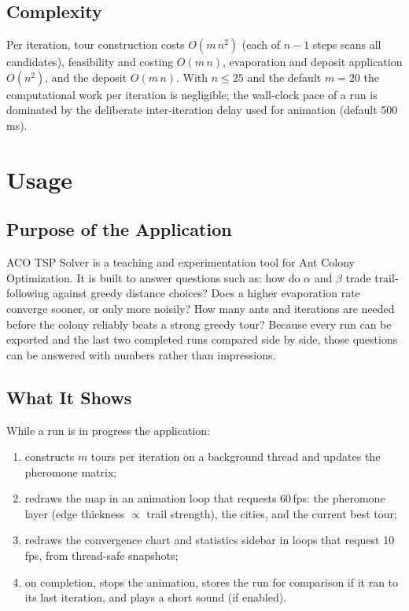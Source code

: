 \documentclass[11pt,a4paper]{article}
\begin{document}
\subsection{Complexity}
Per iteration, tour construction costs $O(m\,n^2)$ (each of $n-1$ steps scans all candidates), feasibility
and costing $O(m\,n)$, evaporation and deposit application $O(n^2)$, and the deposit $O(m\,n)$. With
$n\le25$ and the default $m=20$ the computational work per iteration is negligible; the wall-clock pace of a
run is dominated by the deliberate inter-iteration delay used for animation (default 500\,ms).

\section{Usage}

\subsection{Purpose of the Application}
ACO TSP Solver is a teaching and experimentation tool for Ant Colony Optimization. It is built to answer
questions such as: how do $\alpha$ and $\beta$ trade trail-following against greedy distance choices? Does a
higher evaporation rate converge sooner, or only more noisily? How many ants and iterations are needed
before the colony reliably beats a strong greedy tour? Because every run can be exported and the last two
completed runs compared side by side, those questions can be answered with numbers rather than
impressions.

\subsection{What It Shows}
While a run is in progress the application:
\begin{enumerate}
  \item constructs $m$ tours per iteration on a background thread and updates the pheromone matrix;
  \item redraws the map in an animation loop that requests 60\,fps: the pheromone layer (edge thickness $\propto$ trail strength),
        the cities, and the current best tour;
  \item redraws the convergence chart and statistics sidebar in loops that request 10\,fps, from thread-safe snapshots;
  \item on completion, stops the animation, stores the run for comparison if it ran to its last
        iteration, and plays a short sound (if enabled).
\end{enumerate}
\end{document}
